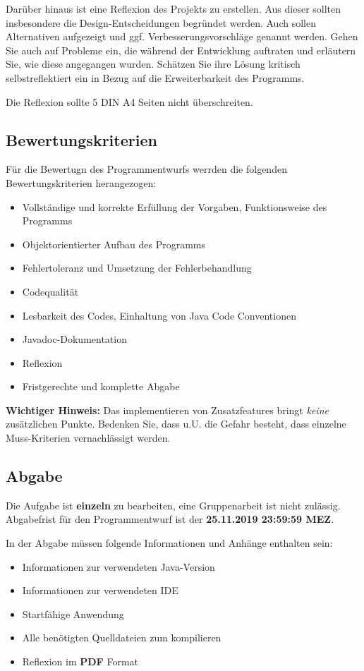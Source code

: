 \documentclass[a4paper,
			   fontsize=12pt]{article}
\begin{document}
Darüber hinaus ist eine Reflexion des Projekts zu erstellen. Aus dieser sollten insbesondere die
Design-Entscheidungen begründet werden. Auch sollen Alternativen aufgezeigt und ggf. Verbesserungsvorschläge genannt werden.
Gehen Sie auch auf Probleme ein, die während der Entwicklung auftraten und erläutern Sie, wie diese angegangen wurden. Schätzen
Sie ihre Lösung kritisch selbstreflektiert ein in Bezug auf die Erweiterbarkeit des Programms.

Die Reflexion sollte 5 DIN A4 Seiten nicht überschreiten.

\subsection*{Bewertungskriterien}

Für die Bewertugn des Programmentwurfs werrden die folgenden Bewertungskriterien herangezogen:

\begin{itemize}
	\item Vollständige und korrekte Erfüllung der Vorgaben, Funktionsweise des Programms
	\item Objektorientierter Aufbau des Programms
	\item Fehlertoleranz und Umsetzung der Fehlerbehandlung
	\item Codequalität
	\item Lesbarkeit des Codes, Einhaltung von Java Code Conventionen
	\item Javadoc-Dokumentation
	\item Reflexion
	\item Fristgerechte und komplette Abgabe
\end{itemize}

\textbf{Wichtiger Hinweis:} Das implementieren von Zusatzfeatures bringt \textit{keine} zusätzlichen Punkte. Bedenken Sie, dass u.U. die
Gefahr besteht, dass einzelne Muss-Kriterien vernachlässigt werden.

\subsection*{Abgabe}

Die Aufgabe ist \textbf{einzeln} zu bearbeiten, eine Gruppenarbeit ist nicht zulässig. Abgabefrist für den Programmentwurf ist der \textbf{25.11.2019 23:59:59 MEZ}.

In der Abgabe müssen folgende Informationen und Anhänge enthalten sein:
\begin{itemize}
	\item Informationen zur verwendeten Java-Version
	\item Informationen zur verwendeten IDE
	\item Startfähige Anwendung
	\item Alle benötigten Quelldateien zum kompilieren
	\item Reflexion im \textbf{PDF} Format
\end{itemize}
\end{document}
